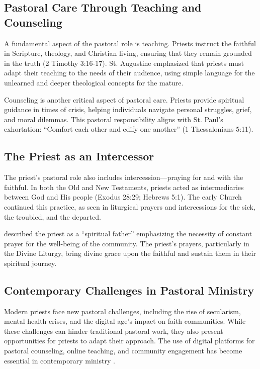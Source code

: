 \documentclass[12pt,doc]{apa7}   	%
\begin{document}
\subsection{Pastoral Care Through Teaching and Counseling}

A fundamental aspect of the pastoral role is teaching. Priests instruct the faithful in Scripture, theology, and Christian living, ensuring that they remain grounded in the truth (2 Timothy 3:16-17). St. Augustine \citep{early_church_akin} emphasized that priests must adapt their teaching to the needs of their audience, using simple language for the unlearned and deeper theological concepts for the mature.

Counseling is another critical aspect of pastoral care. Priests provide spiritual guidance in times of crisis, helping individuals navigate personal struggles, grief, and moral dilemmas. This pastoral responsibility aligns with St. Paul’s exhortation: ``Comfort each other and edify one another'' (1 Thessalonians 5:11).

\subsection{The Priest as an Intercessor}

The priest’s pastoral role also includes intercession—praying for and with the faithful. In both the Old and New Testaments, priests acted as intermediaries between God and His people (Exodus 28:29; Hebrews 5:1). The early Church continued this practice, as seen in liturgical prayers and intercessions for the sick, the troubled, and the departed.

\citet{priests_zacharias} described the priest as a ``spiritual father'' emphasizing the necessity of constant prayer for the well-being of the community. The priest’s prayers, particularly in the Divine Liturgy, bring divine grace upon the faithful and sustain them in their spiritual journey.

\subsection{Contemporary Challenges in Pastoral Ministry}

Modern priests face new pastoral challenges, including the rise of secularism, mental health crises, and the digital age’s impact on faith communities. While these challenges can hinder traditional pastoral work, they also present opportunities for priests to adapt their approach. The use of digital platforms for pastoral counseling, online teaching, and community engagement has become essential in contemporary ministry \citep{orthodox_church_ware}. 
\end{document}
